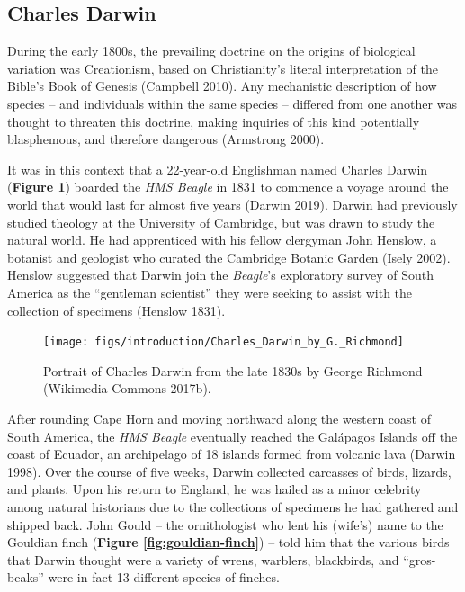 \documentclass[
]{book}
\begin{document}
\hypertarget{charles-darwin}{%
\subsection{Charles Darwin}\label{charles-darwin}}

During the early 1800s, the prevailing doctrine on the origins of biological variation was Creationism, based on Christianity's literal interpretation of the Bible's Book of Genesis (Campbell 2010). Any mechanistic description of how species -- and individuals within the same species -- differed from one another was thought to threaten this doctrine, making inquiries of this kind potentially blasphemous, and therefore dangerous (Armstrong 2000).

It was in this context that a 22-year-old Englishman named Charles Darwin (\textbf{Figure \ref{fig:charles-darwin-young-portrait}}) boarded the \emph{HMS Beagle} in 1831 to commence a voyage around the world that would last for almost five years (Darwin 2019). Darwin had previously studied theology at the University of Cambridge, but was drawn to study the natural world. He had apprenticed with his fellow clergyman John Henslow, a botanist and geologist who curated the Cambridge Botanic Garden (Isely 2002). Henslow suggested that Darwin join the \emph{Beagle}'s exploratory survey of South America as the ``gentleman scientist'' they were seeking to assist with the collection of specimens (Henslow 1831).



\begin{figure}

{\centering \texttt{[image: figs/introduction/Charles\_Darwin\_by\_G.\_Richmond]} 

}

\caption{Portrait of Charles Darwin from the late 1830s by George Richmond (Wikimedia Commons 2017b).}\label{fig:charles-darwin-young-portrait}
\end{figure}

After rounding Cape Horn and moving northward along the western coast of South America, the \emph{HMS Beagle} eventually reached the Galápagos Islands off the coast of Ecuador, an archipelago of 18 islands formed from volcanic lava (Darwin 1998). Over the course of five weeks, Darwin collected carcasses of birds, lizards, and plants. Upon his return to England, he was hailed as a minor celebrity among natural historians due to the collections of specimens he had gathered and shipped back. John Gould -- the ornithologist who lent his (wife's) name to the Gouldian finch (\textbf{Figure \ref{fig:gouldian-finch}}) -- told him that the various birds that Darwin thought were a variety of wrens, warblers, blackbirds, and ``gros-beaks'' were in fact 13 different species of finches.
\end{document}
